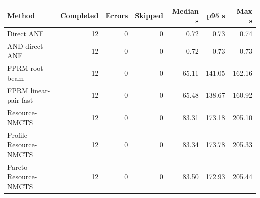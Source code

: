 \begin{tabular}{lrrrrrr}
\toprule
Method & Completed & Errors & Skipped & Median s & p95 s & Max s \\
\midrule
Direct ANF & 12 & 0 & 0 & 0.72 & 0.73 & 0.74 \\
AND-direct ANF & 12 & 0 & 0 & 0.72 & 0.73 & 0.73 \\
FPRM root beam & 12 & 0 & 0 & 65.11 & 141.05 & 162.16 \\
FPRM linear-pair fast & 12 & 0 & 0 & 65.48 & 138.67 & 160.92 \\
Resource-NMCTS & 12 & 0 & 0 & 83.31 & 173.18 & 205.10 \\
Profile-Resource-NMCTS & 12 & 0 & 0 & 83.34 & 173.78 & 205.33 \\
Pareto-Resource-NMCTS & 12 & 0 & 0 & 83.50 & 172.93 & 205.44 \\
\bottomrule
\end{tabular}

